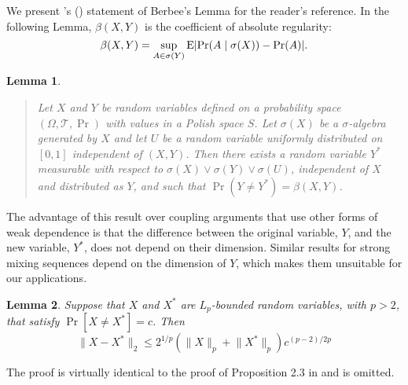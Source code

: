\documentclass[11pt]{article}
\newtheorem{lem}{Lemma}
\begin{document}
We present \citeauthor{MeP:02}'s
(\citeyear{MeP:02}) statement of Berbee's Lemma for
the reader's reference.  In the following Lemma, $\beta(X,Y)$ is the
coefficient of absolute regularity:
\[
\beta(X,Y) = \sup_{A \in \sigma(Y)} \operatorname{E} \lvert \Pr(A \mid \sigma(X))
  - \Pr(A) \rvert.
\]
\begin{lem}\label{lem-berbee}\quad

\begin{quotation}\noindent
  Let $X$ and $Y$ be random variables defined on a probability space
  $(\Omega, \mathcal{T}, \Pr)$ with values in a Polish space
  $S$.  Let $\sigma(X)$ be a $\sigma$-algebra generated by $X$ and let
  $U$ be a random variable uniformly distributed on $[0,1]$
  independent of $(X,Y)$.  Then there exists a random variable $Y^{*}$
  measurable with respect to $\sigma(X) \vee \sigma(Y) \vee
  \sigma(U)$, independent of $X$ and distributed as $Y$, and such that
  $\Pr(Y \neq Y^{*}) = \beta(X,Y)$.

  \noindent\citep{MeP:02}
\end{quotation}
\end{lem}

The advantage of this result over coupling arguments that use other
forms of weak dependence is that the difference between the original
variable, $Y$, and the new variable, $Y^{*}$, does not depend on their
dimension.  Similar results for strong mixing sequences depend on the
dimension of $Y$, which makes them unsuitable for our applications.

\begin{lem}\label{lem-extend-mp}
  Suppose that $X$ and $X^*$ are $L_p$-bounded random variables, with
  $p > 2$, that satisfy ${\Pr[X \neq X^*] = c}$.  Then
  \[
    \lVert X - X^* \rVert_2 \leq 2^{1/p} (\lVert X \rVert_p + \lVert
    X^* \rVert_p) c^{(p-2)/2p}
  \]
\end{lem}

The proof is virtually identical to the proof of Proposition 2.3 in
\citet{MeP:02} and is omitted.
\end{document}
